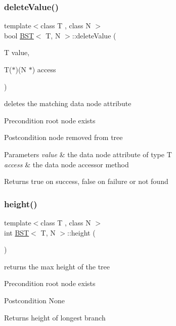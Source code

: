 \subsubsection{\texorpdfstring{delete\+Value()}{deleteValue()}}
{\footnotesize\ttfamily template$<$class T , class N $>$ \\
bool \hyperlink{class_b_s_t}{B\+ST}$<$ T, N $>$\+::delete\+Value (\begin{DoxyParamCaption}\item[{T}]{value,  }\item[{T($\ast$)(N $\ast$)}]{access }\end{DoxyParamCaption})}

deletes the matching data node attribute \begin{DoxyPrecond}{Precondition}
root node exists 
\end{DoxyPrecond}
\begin{DoxyPostcond}{Postcondition}
node removed from tree 
\end{DoxyPostcond}

\begin{DoxyParams}{Parameters}
{\em value} & the data node attribute of type T \\
\hline
{\em access} & the data node accessor method \\
\hline
\end{DoxyParams}
\begin{DoxyReturn}{Returns}
true on success, false on failure or not found 
\end{DoxyReturn}
\mbox{\label{class_b_s_t_a84bfd35b9fdf74574ffcac8b33a129b3}} 
\subsubsection{\texorpdfstring{height()}{height()}}
{\footnotesize\ttfamily template$<$class T , class N $>$ \\
int \hyperlink{class_b_s_t}{B\+ST}$<$ T, N $>$\+::height (\begin{DoxyParamCaption}{ }\end{DoxyParamCaption})}

returns the max height of the tree \begin{DoxyPrecond}{Precondition}
root node exists 
\end{DoxyPrecond}
\begin{DoxyPostcond}{Postcondition}
None 
\end{DoxyPostcond}
\begin{DoxyReturn}{Returns}
height of longest branch 
\end{DoxyReturn}
\mbox{\label{class_b_s_t_a69e01758890117297b34b79317c7c112}} 
